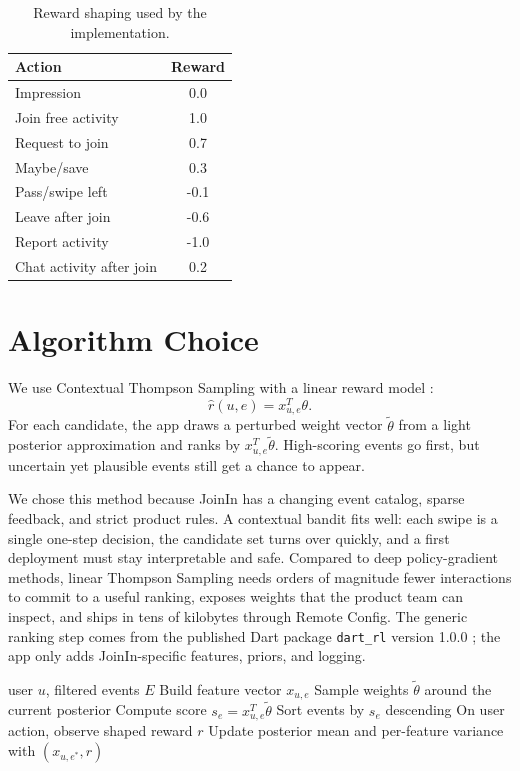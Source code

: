 \documentclass{article}
\begin{document}
\begin{table}[t]
\caption{Reward shaping used by the implementation.}
\label{tab:rewards}
\vskip 0.1in
\begin{center}
\begin{small}
\begin{tabular}{lc}
\toprule
Action & Reward \\
\midrule
Impression & 0.0 \\
Join free activity & 1.0 \\
Request to join & 0.7 \\
Maybe/save & 0.3 \\
Pass/swipe left & -0.1 \\
Leave after join & -0.6 \\
Report activity & -1.0 \\
Chat activity after join & 0.2 \\
\bottomrule
\end{tabular}
\end{small}
\end{center}
\vskip -0.1in
\end{table}

\section{Algorithm Choice}
We use Contextual Thompson Sampling with a linear reward model \cite{agrawal2013thompson,li2010contextual}:
\[
\hat{r}(u,e) = x_{u,e}^{T}\theta.
\]
For each candidate, the app draws a perturbed weight vector $\tilde{\theta}$ from a light posterior approximation and ranks by $x_{u,e}^{T}\tilde{\theta}$. High-scoring events go first, but uncertain yet plausible events still get a chance to appear.

We chose this method because JoinIn has a changing event catalog, sparse feedback, and strict product rules. A contextual bandit fits well: each swipe is a single one-step decision, the candidate set turns over quickly, and a first deployment must stay interpretable and safe. Compared to deep policy-gradient methods, linear Thompson Sampling needs orders of magnitude fewer interactions to commit to a useful ranking, exposes weights that the product team can inspect, and ships in tens of kilobytes through Remote Config. The generic ranking step comes from the published Dart package \texttt{dart\_rl} version 1.0.0 \cite{dartRlPackage}; the app only adds JoinIn-specific features, priors, and logging.

\begin{algorithm}[tb]
\caption{Feed re-ranking with Contextual Thompson Sampling}
\label{alg:cts}
\begin{algorithmic}
 user $u$, filtered events $E$
\STATE Build feature vector $x_{u,e}$
\STATE Sample weights $\tilde{\theta}$ around the current posterior
\STATE Compute score $s_e = x_{u,e}^{T}\tilde{\theta}$
\ENDFOR
\STATE Sort events by $s_e$ descending
\STATE On user action, observe shaped reward $r$
\STATE Update posterior mean and per-feature variance with $(x_{u,e^*}, r)$
\end{algorithmic}
\end{algorithm}
\end{document}
